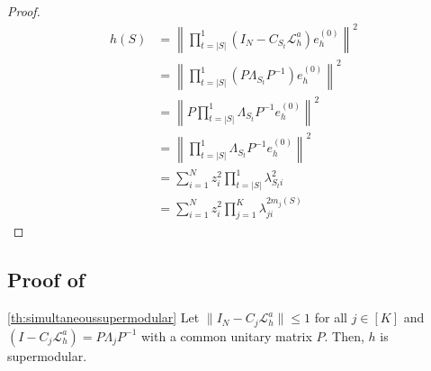 \documentclass{article}
\newcommand{\edit}[1]{{\color{red}#1}}
\begin{document}
\begin{proof}

\begin{align*}
    h(S) &= \left\|\prod_{t = |S|}^1\left(I_N - C_{S_t} \mathcal{L}_{h}^a\right)  e^{(0)}_h \right\|^2 \\
    &=  \left\|\prod_{t = |S|}^1\left(P\Lambda_{S_t}P^{-1}\right)  e^{(0)}_h \right\|^2 \\
    &=  \left\|P\prod_{t = |S|}^1\Lambda_{S_t}P^{-1}  e^{(0)}_h \right\|^2 \\
    &= \left\|\prod_{t = |S|}^1\Lambda_{S_t}P^{-1}  e^{(0)}_h \right\|^2\\
    &=  \sum_{i = 1}^N z_i^2 \prod_{t = |S|}^1 \lambda_{S_ti}^2 \\
    &=  \sum_{i = 1}^N z_i^2 \prod_{j = 1}^K \lambda_{ji}^{2m_j(S)} 
\end{align*}

\end{proof}

\subsection{Proof of } \label{sec:proofsimultaneoussupermodular}
\begin{customproposition}{\ref{th:simultaneoussupermodular}}
    Let $\|I_N - C_j\mathcal{L}_h^a\| \leq 1$ for all $j \in [K]$ and $\left(I - C_j \mathcal{L}_{h}^a\right) = P\Lambda_jP^{-1}$ \edit{with a common unitary matrix $P$}. Then, $h$ is supermodular. 
\end{customproposition}
\end{document}
